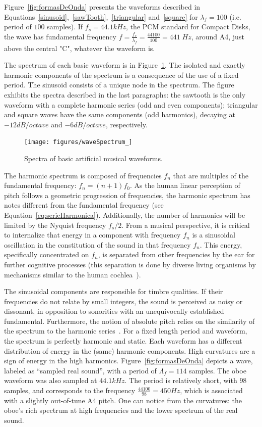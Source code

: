 Figure~\ref{fig:formasDeOnda} presents the waveforms described in Equations~\ref{sinusoid},~\ref{sawTooth},~\ref{triangular} and~\ref{square} for $\lambda_f=100$ (i.e. period of $100$ samples). If $f_s=44.1kHz$, the PCM standard for Compact Disks, the wave has fundamental frequency $f=\frac{f_s}{\lambda_f}=\frac{44100}{100} = 441 \; Hz$, around A4, just above the central "C", whatever the waveform is.

The spectrum of each basic waveform is in Figure~\ref{fig:espectroDeOndas}. The isolated and exactly harmonic components of the spectrum is a consequence of the use of a fixed period. The sinusoid consists of a unique node in the spectrum. The figure exhibits the spectra described in the last paragraphs: the sawtooth is the only waveform with a complete harmonic series (odd and even components); triangular and square waves have the same components (odd harmonics), decaying at $-12dB/octave$ and $-6dB/octave$, respectively.

\begin{figure}
    \centering
        \texttt{[image: figures/waveSpectrum\_]}
    \caption{Spectra of basic artificial musical waveforms.}
        \label{fig:espectroDeOndas}
\end{figure}

The harmonic spectrum is composed of frequencies $f_n$ that are multiples of the fundamental frequency: $f_n=(n+1)f_0$. As the human linear perception of pitch follows a geometric progression of frequencies, the harmonic spectrum has notes different from the fundamental frequency (see Equation~\ref{eq:serieHarmonica}). Additionally, the number of harmonics will be limited by the Nyquist frequency $f_s/2$. From a musical perspective, it is critical to internalize that energy in a component with frequency $f_n$ is a sinusoidal oscillation in the constitution of the sound in that frequency $f_n$. This energy, specifically concentrated on $f_n$, is separated from other frequencies by the ear for further cognitive processes (this separation is done by diverse living organisms by mechanisms similar to the human cochlea~\cite{Roederer}).

The sinusoidal components are responsible for timbre qualities. If their frequencies do not relate by small integers, the sound is perceived as noisy or dissonant, in opposition to sonorities with an unequivocally established fundamental. Furthermore, the notion of absolute pitch relies on the similarity of the spectrum to the harmonic series~\cite{Roederer}. For a fixed length period and waveform, the spectrum is perfectly harmonic and static. Each waveform has a different distribution of energy in the (same) harmonic components. High curvatures are a sign of energy in the high harmonics. Figure~\ref{fig:formasDeOnda} depicts a wave, labeled as ``sampled real sound'', with a period of $\Lambda_f=114$ samples. The oboe waveform was also sampled at $44.1kHz$. The period is relatively short, with $98$ samples, and corresponds to the frequency $\frac{44100}{98}=450Hz$, which is associated with a slightly out-of-tune A4 pitch. One can notice from the curvatures: the oboe's rich spectrum at high frequencies and the lower spectrum of the real sound.

